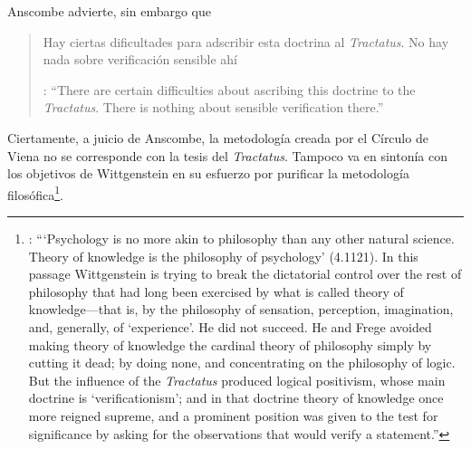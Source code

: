 Anscombe advierte, sin embargo que \blockquote[{\cite[150]{anscombe1959iwt}}: \enquote{There are certain difficulties about ascribing this doctrine to the \emph{Tractatus}. There is nothing about sensible verification there.}]{Hay ciertas dificultades para adscribir esta doctrina al \emph{Tractatus}. No hay nada sobre verificación sensible ahí}. Ciertamente, a juicio de Anscombe, la metodología creada por el Círculo de Viena no se corresponde con la tesis del \emph{Tractatus}. Tampoco va en sintonía con los objetivos de Wittgenstein en su esfuerzo por purificar la metodología filosófica\footnote{\cite[Cf.~][152]{anscombe1959iwt}: \enquote{`Psychology is no more akin to philosophy than any other natural science. Theory of knowledge is the philosophy of psychology' (4.1121). In this passage Wittgenstein is trying to break the dictatorial control over the rest of philosophy that had long been exercised by what is called theory of knowledge---that is, by the philosophy of sensation, perception, imagination, and, generally, of `experience'. He did not succeed. He and Frege avoided making theory of knowledge the cardinal theory of philosophy simply by cutting it dead; by doing none, and concentrating on the philosophy of logic. But the influence of the \emph{Tractatus} produced logical positivism, whose main doctrine is `verificationism'; and in that doctrine theory of knowledge once more reigned supreme, and a prominent position was given to the test for significance by asking for the observations that would verify a statement.}}.


